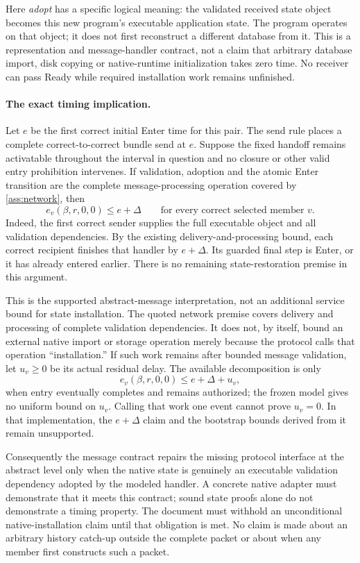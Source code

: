 Here \emph{adopt} has a specific logical meaning: the validated received
state object becomes this new program's executable application state.
The program operates on that object; it does not first reconstruct a
different database from it. This is a representation and message-handler
contract, not a claim that arbitrary database import, disk copying or
native-runtime initialization takes zero time. No receiver can pass Ready
while required installation work remains unfinished.

\paragraph{The exact timing implication.}
Let $e$ be the first correct initial Enter time for this pair. The send
rule places a complete correct-to-correct bundle send at $e$. Suppose the
fixed handoff remains activatable throughout the interval in question
and no closure or other valid entry prohibition intervenes.
If validation, adoption and the atomic Enter transition are the complete
message-processing operation covered by \cref{ass:network}, then
\[
 e_v(\beta,r,0,0)\le e+\Delta
 \qquad\text{for every correct selected member }v.
\]
Indeed, the first correct sender supplies the full executable object and
all validation dependencies. By the existing delivery-and-processing
bound, each correct recipient finishes that handler by $e+\Delta$.
Its guarded final step is Enter, or it has already entered earlier.
There is no remaining state-restoration premise in this argument.

This is the supported abstract-message interpretation, not an additional
service bound for state installation. The quoted network premise covers
delivery and processing of complete validation dependencies. It does not,
by itself, bound an external native import or storage operation merely
because the protocol calls that operation ``installation.'' If such work
remains after bounded message validation, let $u_v\ge0$ be its actual
residual delay. The available decomposition is only
\[
 e_v(\beta,r,0,0)\le e+\Delta+u_v,
\]
when entry eventually completes and remains authorized; the frozen model
gives no uniform bound on $u_v$. Calling that work one event cannot prove
$u_v=0$. In that implementation, the $e+\Delta$ claim and the bootstrap
bounds derived from it remain unsupported.

Consequently the message contract repairs the missing protocol interface
at the abstract level only when the native state is genuinely an executable
validation dependency adopted by the modeled handler. A concrete native
adapter must demonstrate that it meets this contract; sound state proofs
alone do not demonstrate a timing property. The document must withhold
an unconditional native-installation claim until that obligation is met.
No claim is made about an arbitrary history catch-up outside the complete
packet or about when any member first constructs such a packet.

